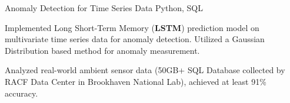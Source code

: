 \begin{cventries}

\projentry
{Anomaly Detection for Time Series Data}
{Python, SQL} %
{ %
\begin{cvitems}
\item{Implemented Long Short-Term Memory (\textbf{LSTM}) prediction model on multivariate time series data for anomaly detection. Utilized a Gaussian Distribution based method for anomaly measurement.}
\item{Analyzed real-world ambient sensor data (50GB+ SQL Database collected by RACF Data Center in Brookhaven National Lab), achieved at least 91\% accuracy.}
\end{cvitems}
}







\end{cventries}
